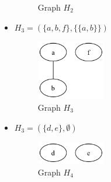 \documentclass[a4paper,11pt]{report}
\begin{document}
\begin{itemize}
\begin{figure}[htbp]
        \caption{Graph $H_2$}
        \label{fig:graph_h_2}
    \end{figure}
    \item $H_3 = (\{ a, b, f\}, \{ \{a, b\}\})$
    \begin{figure}[htbp]
        \centering
        \includegraphics[width=3cm]{notebook/assets/aufgabe_04_h3.png}
        \caption{Graph $H_3$}
        \label{fig:graph_h_3}
    \end{figure}
    \item $H_3 = (\{ d, e\},\emptyset)$
    \begin{figure}[htbp]
        \centering
        \includegraphics[width=3cm]{notebook/assets/aufgabe_04_h4.png}
        \caption{Graph $H_4$}
        \label{fig:graph_h_4}
    \end{figure}
\end{itemize}
\end{document}
